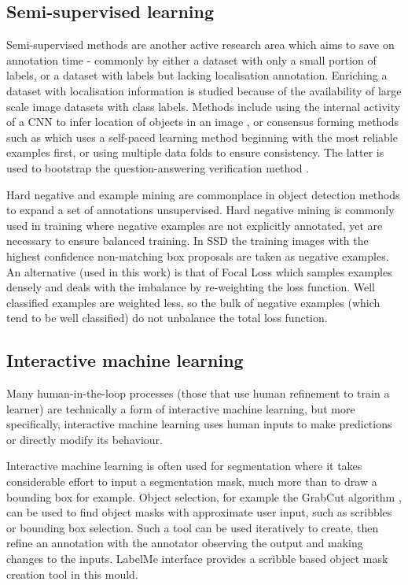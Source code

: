 \subsection{Semi-supervised learning}

Semi-supervised methods are another active research area which aims to save on annotation time - commonly by either a dataset with only a small portion of labels, or a dataset with labels but lacking localisation annotation. Enriching a dataset with localisation information is studied because of the availability of large scale image datasets with class labels. Methods include using the internal activity of a \gls{CNN} to infer location of objects in an image \cite{Sivic2015}, or consensus forming methods such as \cite{Sangineto} which uses a self-paced learning method beginning with the most reliable examples first, or \cite{Cinbis2017} using multiple data folds to ensure consistency. The latter is used to bootstrap the question-answering verification method \cite{Papadopoulos2016}.

Hard negative and example mining are commonplace in object detection methods to expand a set of annotations unsupervised. Hard negative mining is commonly used in training where negative examples are not explicitly annotated, yet are necessary to ensure balanced training. In \gls{SSD} \cite{Liu2016a} the training images with the highest confidence non-matching  box proposals are taken as negative examples. An alternative (used in this work) is that of Focal Loss \cite{Lin2017} which samples examples densely and deals with the imbalance by re-weighting the loss function. Well classified examples are weighted less, so the bulk of negative examples (which tend to be well classified) do not unbalance the total loss function.

\subsection{Interactive machine learning}

Many human-in-the-loop processes (those that use human refinement to train a learner) are technically a form of interactive machine learning, but more specifically, interactive machine learning uses human inputs to make predictions or directly modify its behaviour.

Interactive machine learning is often used for segmentation where it takes considerable effort to input a segmentation mask, much more than to draw a bounding box for example. Object selection, for example the GrabCut algorithm \cite{Rother}, can be used to find object masks with approximate user input, such as scribbles or bounding box selection. Such a tool can be used iteratively to create, then refine an annotation with the annotator observing the output and making changes to the inputs.  LabelMe \cite{Russell2007} interface provides a scribble based object mask creation tool in this mould. 

